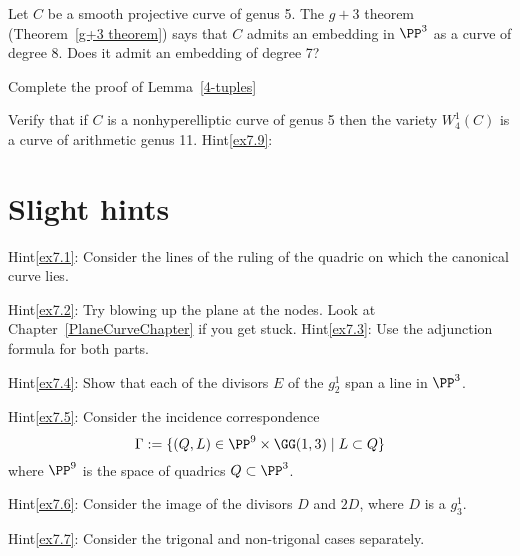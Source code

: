 \begin{exercise}\label{ex7.7}
Let $C$ be a smooth projective curve of genus 5. The $g+3$ theorem (Theorem~\ref{g+3 theorem}) says that $C$ admits an embedding in $\PP^3$ as a curve of degree 8. Does it admit an embedding of degree 7?
\end{exercise}

\begin{exercise}\label{non-red 4-tuples}\label{ex7.8}
Complete the proof of Lemma~\ref{4-tuples}
\end{exercise}

\begin{exercise}\label{ex7.9}
Verify that if $C$ is a nonhyperelliptic curve of genus 5 then the variety $W^1_4(C)$ is a curve of arithmetic genus 11.
Hint\ref{ex7.9}: \end{exercise}

\section{Slight hints}
Hint\ref{ex7.1}: Consider the lines of the ruling of the quadric on which the canonical curve lies.

Hint\ref{ex7.2}: Try blowing up the plane at the nodes. Look at Chapter~\ref{PlaneCurveChapter} if you get stuck.
Hint\ref{ex7.3}: Use the adjunction formula for both parts.

Hint\ref{ex7.4}: Show that each of the divisors $E$ of the $g^1_2$ span a line in $\PP^3$. 

Hint\ref{ex7.5}: Consider the incidence correspondence
$$
\Gamma := \{ (Q, L) \in \PP^9 \times \GG(1,3) \mid L \subset Q \}
$$
where $\PP^9$ is the space of quadrics $Q\subset \PP^3$.

Hint\ref{ex7.6}: Consider the image of the divisors $D$ and $2D$, where $D$ is a $g^1_3$.

Hint\ref{ex7.7}: Consider the trigonal and non-trigonal cases separately. 




